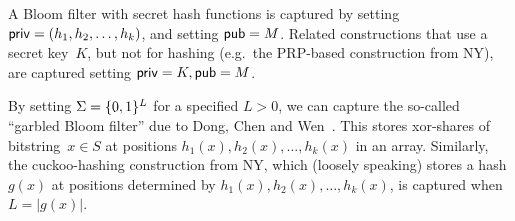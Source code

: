 A Bloom filter with secret hash functions is captured by setting
${\sf priv}=(h_1,h_2,\ldots,h_k)$, and setting ${\sf pub}=M$.
Related constructions that use a secret key~$K$, but not for hashing (e.g.\ the PRP-based
construction from NY), are captured setting ${\sf priv}=K, {\sf pub}=M$.

By setting $\Sigma=\{0,1\}^L$ for a specified $L>0$, we can capture
the so-called ``garbled Bloom filter'' due to Dong, Chen and
Wen~\cite{xxx}.  This stores
xor-shares of bitstring~$x \in S$ at positions
$h_1(x),h_2(x),\ldots,h_k(x)$ in an array. Similarly, the
cuckoo-hashing construction from NY, which (loosely speaking) stores
a hash $g(x)$ at positions determined by
$h_1(x),h_2(x),\ldots,h_k(x)$, is captured when $L=|g(x)|$.
